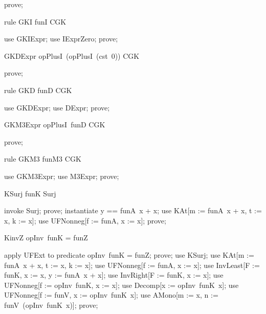 \documentclass{article}
\begin{document}
\begin{zproof}
prove;
\end{zproof}

\begin{theorem}{rule GKI}
  funI \in CGK
\end{theorem}

\begin{zproof}
use GKIExpr;
use IExprZero;
prove;
\end{zproof}

\begin{theorem}{GKDExpr}
  opPlusI~(opPlusI~(cst~0)) \in CGK
\end{theorem}

\begin{zproof}
prove;
\end{zproof}

\begin{theorem}{rule GKD}
  funD \in CGK
\end{theorem}

\begin{zproof}
use GKDExpr;
use DExpr;
prove;
\end{zproof}

\begin{theorem}{GKM3Expr}
  opPlusI~funD \in CGK
\end{theorem}

\begin{zproof}
prove;
\end{zproof}

\begin{theorem}{rule GKM3}
  funM3 \in CGK
\end{theorem}

\begin{zproof}
use GKM3Expr;
use M3Expr;
prove;
\end{zproof}


\begin{theorem}{KSurj}
  funK \in Surj
\end{theorem}

\begin{zproof}
invoke Surj;
prove;
instantiate y == funA~x + x;
use KAt[m := funA~x + x, t := x, k := x];
use UFNonneg[f := funA, x := x];
prove;
\end{zproof}

\begin{theorem}{KinvZ}
  opInv~funK = funZ
\end{theorem}

\begin{zproof}
apply UFExt to predicate opInv~funK = funZ;
prove;
use KSurj;
use KAt[m := funA~x + x, t := x, k := x];
use UFNonneg[f := funA, x := x];
use InvLeast[F := funK, x := x, y := funA~x + x];
use InvRight[F := funK, x := x];
use UFNonneg[f := opInv~funK, x := x];
use Decomp[x := opInv~funK~x];
use UFNonneg[f := funV, x := opInv~funK~x];
use AMono[m := x, n := funV~(opInv~funK~x)];
prove;
\end{zproof}
\end{document}
